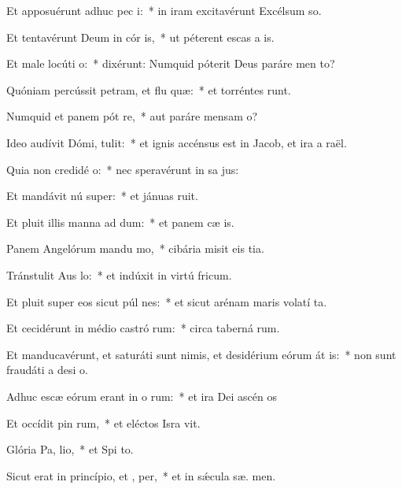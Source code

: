 \item Et apposuérunt adhuc pec i:~* in iram excitavérunt Excélsum  so.
\item Et tentavérunt Deum in cór is,~* ut péterent escas a is.
\item Et male locúti   o:~* dixérunt: Numquid póterit Deus paráre men  to?
\item Quóniam percússit petram, et flu quæ:~* et torréntes runt.
\item Numquid et panem pót re,~* aut paráre mensam  o?
\item Ideo audívit Dómi,  tulit:~* et ignis accénsus est in Jacob, et ira a  raël.
\item Quia non credidé  o:~* nec speravérunt in sa jus:
\item Et mandávit nú super:~* et jánuas  ruit.
\item Et pluit illis manna ad dum:~* et panem cæ  is.
\item Panem Angelórum mandu mo,~* cibária misit eis  tia.
\item Tránstulit Aus  lo:~* et indúxit in virtú  fricum.
\item Et pluit super eos sicut púl nes:~* et sicut arénam maris volatí ta.
\item Et cecidérunt in médio castró rum:~* circa taberná rum.
\item Et manducavérunt, et saturáti sunt nimis, et desidérium eórum át is:~* non sunt fraudáti a desi o.
\item Adhuc escæ eórum erant in o rum:~* et ira Dei ascén  os
\item Et occídit pin rum,~* et eléctos Isra vit.
\item Glória Pa,  lio,~* et Spi to.
\item Sicut erat in princípio, et ,  per,~* et in sǽcula sæ. men.
